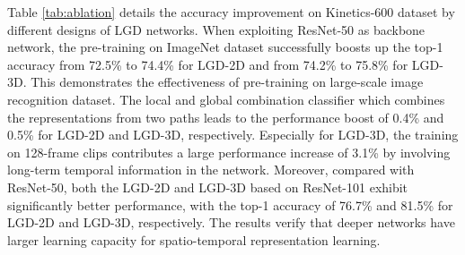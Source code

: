 \documentclass[10pt,twocolumn,letterpaper]{article}
\begin{document}
Table \ref{tab:ablation} details the accuracy improvement on Kinetics-600 dataset by different designs of LGD networks. When exploiting ResNet-50 as backbone network, the pre-training on ImageNet dataset successfully boosts up the top-1 accuracy from 72.5\% to 74.4\% for LGD-2D and from 74.2\% to 75.8\% for LGD-3D. This demonstrates the effectiveness of pre-training on large-scale image recognition dataset. The local and global combination classifier which combines the representations from two paths leads to the performance boost of 0.4\% and 0.5\% for LGD-2D and LGD-3D, respectively. Especially for LGD-3D, the training on 128-frame clips contributes a large performance increase of 3.1\% by involving long-term temporal information in the network. Moreover, compared with ResNet-50, both the LGD-2D and LGD-3D based on ResNet-101 exhibit significantly better performance, with the top-1 accuracy of 76.7\% and 81.5\% for LGD-2D and LGD-3D, respectively. The results verify that deeper networks have larger learning capacity for spatio-temporal representation learning.
\end{document}
